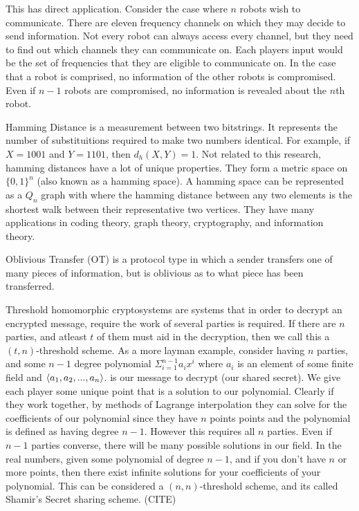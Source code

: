 \documentclass[10pt]{article}
\begin{document}
This has direct application. Consider the case where $n$ robots wish to communicate. There are eleven frequency channels on which they may decide to send information. Not every robot can always access every channel, but they need to find out which channels they can communicate on. Each players input would be the set of frequencies that they are eligible to communicate on. In the case that a robot is comprised, no information of the other robots is compromised. Even if $n-1$ robots are compromised, no information is revealed about the $n$th robot.

Hamming Distance is a measurement between two bitstrings. It represents the number of substituitions required to make two numbers identical. For example, if $X = 1001$ and $Y = 1101$, then $d_h(X,Y) = 1$. Not related to this research, hamming distances have a lot of unique properties. They form a metric space on $\{0,1\}^n$ (also known as a hamming space). A hamming space can be represented as a $Q_n$ graph with where the hamming distance between any two elements is the shortest walk between their representative two vertices. They have many applications in coding theory, graph theory, cryptography, and information theory.

Oblivious Transfer (OT) is a protocol type in which a sender transfers one of many pieces of information, but is oblivious as to what piece has been transferred.

Threshold homomorphic cryptosystems are systems that in order to decrypt an encrypted message, require the work of several parties is required. If there are $n$ parties, and atleast $t$ of them must aid in the decryption, then we call this a $(t,n)$-threshold scheme. As a more layman example, consider having $n$ parties, and some $n-1$ degree polynomial $\Sigma_{i=1}^{n-1} a_i x^i$ where $a_i$ is an element of some finite field and $\braket{a_1,a_2,...,a_n}$. is our message to decrypt (our shared secret). We give each player some unique point that is a solution to  our polynomial. Clearly if they work together, by methods of Lagrange interpolation they can solve for the coefficients of our polynomial since they have $n$ points points and the polynomial is defined as having degree $n-1$. However this requires all $n$ parties. Even if $n-1$ parties converse, there will be many possible solutions in our field. In the real numbers, given some polynomial of degree $n-1$, and if you don't have $n$ or more points, then there exist infinite solutions for your coefficients of your polynomial. This can be considered a $(n,n)$-threshold scheme, and its called Shamir's Secret sharing scheme. (CITE)
\end{document}
